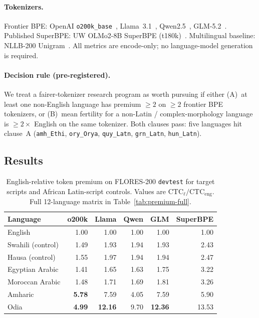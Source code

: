 \documentclass[11pt,a4paper]{article}
\newcommand{\CTC}{\mathrm{CTC}}
\begin{document}
\paragraph{Tokenizers.}
Frontier BPE: OpenAI \texttt{o200k\_base}~\citep{openai2024o200k}, Llama~3.1~\citep{meta2024llama31}, Qwen2.5~\citep{qwen2024qwen25}, GLM-5.2~\citep{glm2025}.
Published SuperBPE: UW OLMo2-8B SuperBPE (t180k)~\citep{uwsuperbpe2025,liu2025superbpe}.
Multilingual baseline: NLLB-200 Unigram~\citep{nllb2022}.
All metrics are encode-only; no language-model generation is required.

\paragraph{Decision rule (pre-registered).}
We treat a fairer-tokenizer research program as worth pursuing if either (A)~at least one non-English language has premium $\ge 2$ on $\ge 2$ frontier BPE tokenizers, or (B)~mean fertility for a non-Latin / complex-morphology language is $\ge 2\times$ English on the same tokenizer.
Both clauses pass: five languages hit clause~A (\texttt{amh\_Ethi}, \texttt{ory\_Orya}, \texttt{quy\_Latn}, \texttt{grn\_Latn}, \texttt{hun\_Latn}).

\subsection{Results}

\begin{table}[t]
\centering
\caption{English-relative token premium on FLORES-200 \texttt{devtest} for target scripts and African Latin-script controls. Values are $\CTC_{\ell}/\CTC_{\mathrm{eng}}$. Full 12-language matrix in Table~\ref{tab:premium-full}.}
\label{tab:tax-highlight}
\small
\begin{tabular}{@{}lrrrrr@{}}
\toprule
Language & o200k & Llama & Qwen & GLM & SuperBPE \\
\midrule
English            & 1.00 & 1.00 & 1.00 & 1.00 & 1.00 \\
Swahili (control)  & 1.49 & 1.93 & 1.94 & 1.93 & 2.43 \\
Hausa (control)    & 1.55 & 1.97 & 1.94 & 1.94 & 2.47 \\
Egyptian Arabic    & 1.41 & 1.65 & 1.63 & 1.75 & 3.22 \\
Moroccan Arabic    & 1.48 & 1.71 & 1.69 & 1.81 & 3.26 \\
Amharic            & \textbf{5.78} & 7.59 & 4.05 & 7.59 & 5.90 \\
Odia               & \textbf{4.99} & \textbf{12.16} & 9.70 & \textbf{12.36} & 13.53 \\
\bottomrule
\end{tabular}
\end{table}
\end{document}
